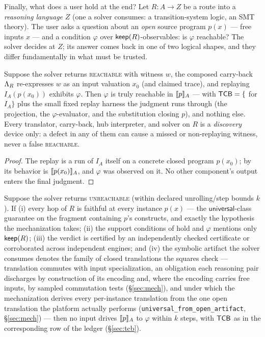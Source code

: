 Finally, what does a user hold at the end? Let $R : A \to Z$ be a route
into a \emph{reasoning language} $Z$ (one a solver consumes: a
transition-system logic, an SMT theory). The user asks a question about
an \emph{open} source program $p(x)$ --- free inputs $x$ --- and a
condition $\varphi$ over $\mathsf{keep}(R)$-observables: is $\varphi$ reachable?
The solver decides at $Z$; its answer comes back in one of two logical
shapes, and they differ fundamentally in what must be trusted.

\begin{theorem}
\label{thm:existential}
Suppose the solver returns \textsc{reachable} with witness $w$, the
composed carry-back $\Lambda_R$ re-expresses $w$ as an input valuation
$x_0$ (and claimed trace), and replaying $I_A(p(x_0))$ exhibits
$\varphi$. Then $\varphi$ is truly reachable in $\llbracket p \rrbracket_{A}$ --- with
$\mathsf{TCB} = \{$ for $I_A\}$ plus the small fixed replay
harness the judgment runs through (the projection, the
$\varphi$-evaluator, and the substitution closing $p$), and nothing
else. Every
translator, carry-back, hub interpreter, and solver on $R$ is a
\emph{discovery} device only: a defect in any of them can cause a missed
or non-replaying witness, never a false \textsc{reachable}.
\end{theorem}

\begin{proof}
The replay is a run of $I_A$ itself on a concrete closed program
$p(x_0)$; by  its behavior is $\llbracket p(x_0) \rrbracket_{A}$, and
$\varphi$ was observed on it. No other component's output enters the
final judgment.
\end{proof}

\begin{theorem}
\label{thm:universal}
Suppose the solver returns \textsc{unreachable} (within declared
unrolling/step bounds $k$). If (i) every hop of $R$ is faithful at every
instance $p(x)$ --- the $\mathsf{universal}$-class guarantee on the
fragment containing $p$'s constructs, and exactly the hypothesis the
mechanization takes; (ii) the support conditions of
 hold and $\varphi$ mentions only $\mathsf{keep}(R)$;
(iii) the verdict is certified by an independently checked certificate
or corroborated across independent engines; and (iv) the symbolic
artifact the solver consumes denotes the family of closed translations
the squares check --- translation commutes with input specialization, an
obligation each reasoning pair discharges by construction of its
encoding and, where the encoding carries free inputs, by sampled
commutation tests (\S\ref{sec:mech}), and under which the mechanization
derives every
per-instance translation from the one open translation the platform
actually performs (\texttt{universal\_from\_open\_artifact},
\S\ref{sec:mech}) --- then no input drives
$\llbracket p \rrbracket_{A}$ to $\varphi$ within $k$ steps, with $\mathsf{TCB}$ as in the
corresponding row of the ledger (\S\ref{sec:tcb}).
\end{theorem}

